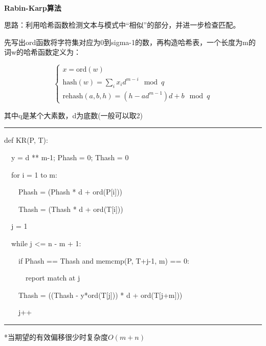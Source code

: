 \documentclass[a4paper,UTF8,fontset=windows]{ctexart}
\newenvironment{code}{\rule{36em}{0.1em}\setlength{\parindent}{1em}

}{

\setlength{\parindent}{0em}\rule{36em}{0.1em}}
\begin{document}
\

\textbf{Rabin-Karp算法}

思路：利用哈希函数检测文本与模式中“相似”的部分，并进一步检查匹配。

先写出ord函数将字符集对应为0到sigma-1的数，再构造哈希表，一个长度为m的词w的哈希函数定义为：

$$\begin{cases}x=\mathrm{ord}(w)\\\mathrm{hash}(w)=\sum_ix_id^{m-i}\mod q\\\mathrm{rehash}(a, b, h)=(h-ad^{m-1})d+b\mod q\end{cases}$$

其中q是某个大素数，d为底数(一般可以取2)

\begin{code}
def KR(P, T):

\ \ y = d ** m-1; Phash = 0; Thash = 0

\ \ for i = 1 to m:

\ \ \ \ Phash = (Phash * d + ord(P[i])) %

\ \ \ \ Thash = (Thash * d + ord(T[i])) %

\ \ j = 1

\ \ while j <= n - m + 1:

\ \ \ \ if Phash == Thash and memcmp(P, T+j-1, m) == 0:

\ \ \ \ \ \ report match at j

\ \ \ \ Thash = ((Thash - y*ord(T[j])) * d + ord(T[j+m])) %

\ \ \ \ j++
\end{code}

*\hspace{0em}当期望的有效偏移很少时复杂度$O(m+n)$
\end{document}
